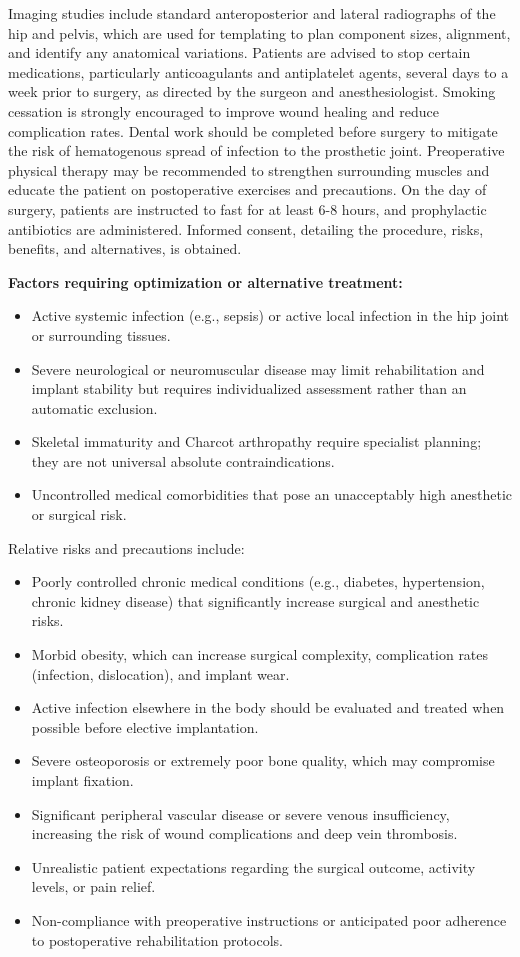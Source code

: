 Imaging studies include standard anteroposterior and lateral radiographs of the hip and pelvis, which are used for templating to plan component sizes, alignment, and identify any anatomical variations. Patients are advised to stop certain medications, particularly anticoagulants and antiplatelet agents, several days to a week prior to surgery, as directed by the surgeon and anesthesiologist. Smoking cessation is strongly encouraged to improve wound healing and reduce complication rates. Dental work should be completed before surgery to mitigate the risk of hematogenous spread of infection to the prosthetic joint. Preoperative physical therapy may be recommended to strengthen surrounding muscles and educate the patient on postoperative exercises and precautions. On the day of surgery, patients are instructed to fast for at least 6-8 hours, and prophylactic antibiotics are administered. Informed consent, detailing the procedure, risks, benefits, and alternatives, is obtained.

\textbf{Factors requiring optimization or alternative treatment:}

\begin{itemize}
  \item Active systemic infection (e.g., sepsis) or active local infection in the hip joint or surrounding tissues.
  \item Severe neurological or neuromuscular disease may limit rehabilitation and implant stability but requires individualized assessment rather than an automatic exclusion.
  \item Skeletal immaturity and Charcot arthropathy require specialist planning; they are not universal absolute contraindications.
  \item Uncontrolled medical comorbidities that pose an unacceptably high anesthetic or surgical risk.
\end{itemize}

Relative risks and precautions include:

\begin{itemize}
  \item Poorly controlled chronic medical conditions (e.g., diabetes, hypertension, chronic kidney disease) that significantly increase surgical and anesthetic risks.
  \item Morbid obesity, which can increase surgical complexity, complication rates (infection, dislocation), and implant wear.
  \item Active infection elsewhere in the body should be evaluated and treated when possible before elective implantation.
  \item Severe osteoporosis or extremely poor bone quality, which may compromise implant fixation.
  \item Significant peripheral vascular disease or severe venous insufficiency, increasing the risk of wound complications and deep vein thrombosis.
  \item Unrealistic patient expectations regarding the surgical outcome, activity levels, or pain relief.
  \item Non-compliance with preoperative instructions or anticipated poor adherence to postoperative rehabilitation protocols.
\end{itemize}

